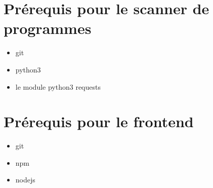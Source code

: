 \section{Prérequis pour le scanner de programmes}
\begin{itemize}
\item git
\item python3
\item le module python3 requests
\end{itemize}

\section{Prérequis pour le frontend}
\begin{itemize}
\item git
\item npm
\item nodejs
\end{itemize}
